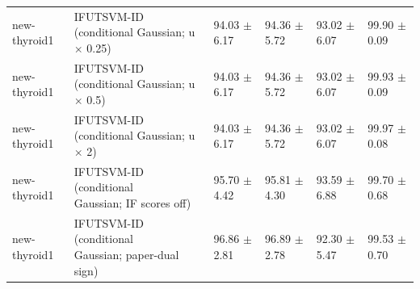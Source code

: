 \begin{table}[!t]
{\begin{tabular}{llllll}
new-thyroid1 & \shortstack[l]{IFUTSVM-ID (conditional\\Gaussian; u \(\times\) 0.25)} & 94.03 \(\pm\) 6.17 & 94.36 \(\pm\) 5.72 & 93.02 \(\pm\) 6.07 & 99.90 \(\pm\) 0.09 \\
new-thyroid1 & \shortstack[l]{IFUTSVM-ID (conditional\\Gaussian; u \(\times\) 0.5)} & 94.03 \(\pm\) 6.17 & 94.36 \(\pm\) 5.72 & 93.02 \(\pm\) 6.07 & 99.93 \(\pm\) 0.09 \\
new-thyroid1 & \shortstack[l]{IFUTSVM-ID (conditional\\Gaussian; u \(\times\) 2)} & 94.03 \(\pm\) 6.17 & 94.36 \(\pm\) 5.72 & 93.02 \(\pm\) 6.07 & 99.97 \(\pm\) 0.08 \\
new-thyroid1 & \shortstack[l]{IFUTSVM-ID (conditional\\Gaussian; IF scores off)} & 95.70 \(\pm\) 4.42 & 95.81 \(\pm\) 4.30 & 93.59 \(\pm\) 6.88 & 99.70 \(\pm\) 0.68 \\
new-thyroid1 & \shortstack[l]{IFUTSVM-ID (conditional\\Gaussian; paper-dual\\sign)} & 96.86 \(\pm\) 2.81 & 96.89 \(\pm\) 2.78 & 92.30 \(\pm\) 5.47 & 99.53 \(\pm\) 0.70 \\
\hline
\end{tabular}%
}
\end{table}

